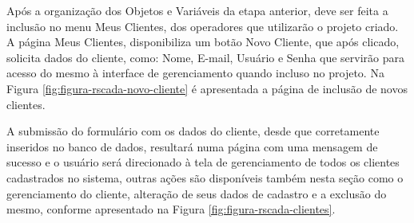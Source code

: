     	\begin{figure}[!h]
    	\end{figure}

Após a organização dos Objetos e Variáveis da etapa anterior, deve ser feita a inclusão no menu Meus Clientes, dos operadores que utilizarão o projeto criado. A página Meus Clientes, disponibiliza um botão Novo Cliente, que após clicado, solicita dados do cliente, como: Nome, E-mail, Usuário e Senha que servirão para acesso do mesmo à interface de gerenciamento quando incluso no projeto. Na Figura \ref{fig:figura-rscada-novo-cliente} é apresentada a página de inclusão de novos clientes.

        \begin{figure}[!h]
    	\end{figure}
    	
\quad

\quad
    	
A submissão do formulário com os dados do cliente, desde que corretamente inseridos no banco de dados, resultará numa página com uma mensagem de sucesso e o usuário será direcionado à tela de gerenciamento de todos os clientes cadastrados no sistema, outras ações são disponíveis também nesta seção como o gerenciamento do cliente, alteração de seus dados de cadastro e a exclusão do mesmo, conforme apresentado na Figura \ref{fig:figura-rscada-clientes}.
    	
